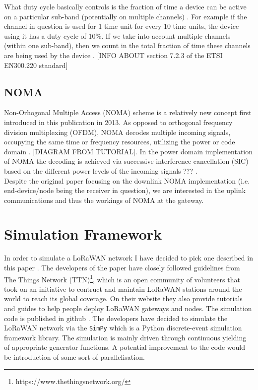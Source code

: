 What duty cycle basically controls is the fraction of time a device can be active on a particular sub-band (potentially on multiple channels) \cite{duty_cycle}. For example if the channel in 
question is used for 1 time unit for every 10 time units,
the device using it has a duty cycle of 10\%. If we take into account multiple channels (within one sub-band), then we count in the total fraction of time these channels are being used by the device \cite{duty_cycle}. [INFO ABOUT section 7.2.3 of the ETSI EN300.220 standard]

\section{NOMA}
 
 Non-Orhogonal Multiple Access (NOMA) scheme is a relatively new concept first introduced in this publication \cite{noma_original} in 2013. As opposed to orthogonal
frequency division multiplexing (OFDM), NOMA decodes multiple incoming signals, occupying the same time 
or frequency resources, utilizing the power or code domain \cite{noma_imperial}. [DIAGRAM FROM TUTORIAL]. In the power domain implementation of NOMA the decoding is achieved via successive interference cancellation (SIC) based on the 
different power levels of the incoming signals \cite{noma_imperial} \cite{noma_original} ??? .\\ 

Despite the original paper \cite{noma_original} focusing on the downlink NOMA
implementation (i.e. end-device/node being the receiver in question), we are interested in the uplink communications and thus the workings of NOMA at the gateway. 
  
 
 
\chapter{Simulation Framework}

In order to simulate a LoRaWAN network I have decided to pick one described in this paper \cite{simulator}. The developers of the paper have closely followed guidelines from The Things Network (TTN)\footnote{https://www.thethingsnetwork.org/}, which is an open community of volunteers that took on an initiative to contruct and maintain LoRaWAN stations around the world to reach its global coverage. On their website they also provide tutorials and guides to help people deploy LoRaWAN gateways and nodes. The simulation code is published in github \cite{simulator_github}. The developers have decided to simulate the LoRaWAN network via the \texttt{SimPy} which is a Python discrete-event simulation framework library\cite{simpy}. The simulation is mainly driven through continuous yielding of appropriate generator functions. A potential improvement to the code would be introduction of some sort of parallelisation.

